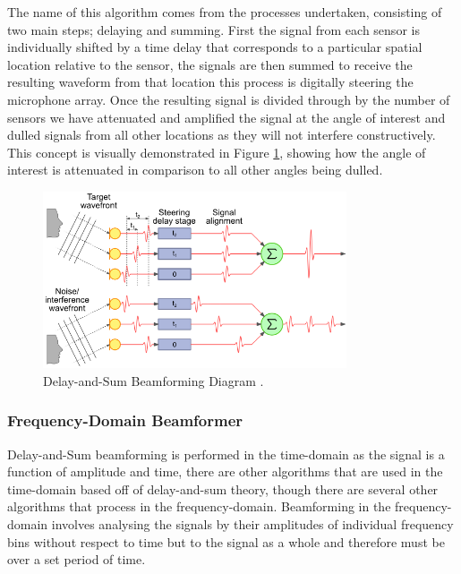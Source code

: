 \documentclass{UoNMCHA}
\numberwithin{equation}{section}
\begin{document}
    The name of this algorithm comes from the processes undertaken, consisting of two main steps; delaying and summing. First the signal from each sensor is individually shifted by a time delay that corresponds to a particular spatial location relative to the sensor, the signals are then summed to receive the resulting waveform from that location \citep{GreWeb} this process is digitally steering the microphone array. Once the resulting signal is divided through by the number of sensors we have attenuated and amplified the signal at the angle of interest and dulled signals from all other locations as they will not interfere constructively. This concept is visually demonstrated in Figure \ref{fig:das-diagram}, showing how the angle of interest is attenuated in comparison to all other angles being dulled.
    
    \begin{figure}[H]
        \centering
        \includegraphics[keepaspectratio, width = 0.8\textwidth]{Figures/DAS-Diagram.png}
        \caption{Delay-and-Sum Beamforming Diagram \citep{GreWeb}.}
        \label{fig:das-diagram}
    \end{figure}
\subsubsection{Frequency-Domain Beamformer} \label{sec:Freq-Domain Beamformer}
    Delay-and-Sum beamforming is performed in the time-domain as the signal is a function of amplitude and time, there are other algorithms that are used in the time-domain based off of delay-and-sum theory, though there are several other algorithms that process in the frequency-domain. Beamforming in the frequency-domain involves analysing the signals by their amplitudes of individual frequency bins without respect to time but to the signal as a whole and therefore must be over a set period of time. 
    
\end{document}
